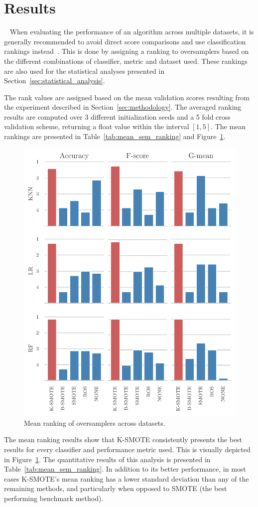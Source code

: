 \documentclass[parskip=full]{scrartcl}
\begin{document}
\section{Results}~\label{sec:results}
When evaluating the performance of an algorithm across multiple datasets, it is
generally recommended to avoid direct score comparisons and use classification
rankings instead~\cite{demvsar2006}. This is done by assigning a ranking to
oversamplers based on the different combinations of classifier, metric and
dataset used. These rankings are also used for the statistical analyses
presented in Section~\ref{sec:statistical_analysis}.

The rank values are assigned based on the mean validation scores resulting from
the experiment described in Section~\ref{sec:methodology}. The averaged ranking
results are computed over 3 different initialization seeds and a 5 fold cross
validation scheme, returning a float value within the interval $[1,5]$. The mean
rankings are presented in Table~\ref{tab:mean_sem_ranking} and
Figure~\ref{fig:mean_rankings_bar_chart}.

\begin{figure}[H]
	\centering
	\includegraphics[width=.6\linewidth]{../analysis/mean_rankings_bar_chart}
	\caption{Mean ranking of oversamplers across datasets.
    }\label{fig:mean_rankings_bar_chart}
\end{figure}

The mean ranking results show that K-SMOTE consistently presents the best
results for every classifier and performance metric used. This is visually
depicted in Figure~\ref{fig:mean_rankings_bar_chart}. The quantitative results
of this analysis is presented in Table~\ref{tab:mean_sem_ranking}. In addition
to its better performance, in most cases K-SMOTE's mean ranking has a lower
standard deviation than any of the remaining methods, and particularly when
opposed to SMOTE (the best performing benchmark method).
\end{document}
